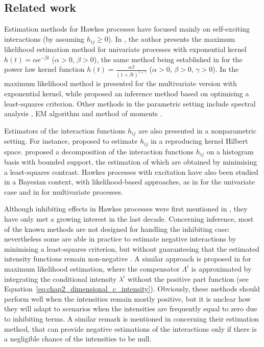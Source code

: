   \subsection{Related work}\label{sec:chap2_literature}
    Estimation methods for Hawkes processes have focused mainly on self-exciting interactions (by assuming $h_{ij} \geq 0$). In \textcite{Ozaki1979}, the author presents the maximum likelihood estimation method for univariate processes with exponential kernel \(h(t) = \alpha \mathrm{e}^{-\beta t}\) (\(\alpha>0\), \(\beta>0\)), the same method being established in \textcite{Mishra2016} for the power law kernel function \(h(t) = \frac{\alpha\beta} {(1 + \beta t)^{1 + \gamma}}\) (\(\alpha>0\), \(\beta>0\), \(\gamma > 0\)). In \textcite{Chen2018} the maximum likelihood method is presented for the multivariate version with exponential kernel, while \textcite{Bacry2020} proposed an inference method based on optimising a least-squares criterion. Other methods in the parametric setting include spectral analysis \parencite{Adamopoulos1976}, EM algorithm \parencite{Veen2008} and method of moments \parencite{DaFonseca2013}.

    Estimators of the interaction functions \(h_{ij}\) are also presented in a nonparametric setting. For instance, \textcite{Yang2017} proposed to estimate \(h_{ij}\) in a reproducing kernel Hilbert space.
    \textcite{Reynaud2014} proposed a decomposition of the interaction functions \(h_{ij}\) on a histogram basis with bounded support, the estimation of which are obtained by minimising a least-squares contrast.
    Hawkes processes with excitation have also been studied in a Bayesian context, with likelihood-based approaches, as in \textcite{Rasmussen2013} for the univariate case and in \textcite{Donnet2020} for multivariate processes.

    Although inhibiting effects in Hawkes processes were first mentioned in \textcite{Bremaud1996}, they have only met a growing interest in the last decade.
    Concerning inference, most of the known methods are not designed for handling the inhibiting case: nevertheless some are able in practice to estimate negative interactions by minimising a least-squares criterion, but without guaranteeing that the estimated intensity functions remain non-negative \parencite{Reynaud2014, Bacry2020}.
    A similar approach is proposed in \textcite{Lemonnier2014} for maximum likelihood estimation, where the compensator \(\Lambda^i\) is approximated by integrating
    the conditional intensity $\lambda^i$ without the positive part function (see Equation~\eqref{eq:chap2_dimensional_c_intensity}).
    Obviously, these methods should perform well when the intensities remain mostly positive, but it is unclear how they will adapt to scenarios when the intensities are frequently equal to zero due to inhibiting terms.
    A similar remark is mentioned in \textcite{Bacry2016} concerning their estimation method, that can provide negative estimations of the interactions only if there is a negligible chance of the intensities to be null.
    
